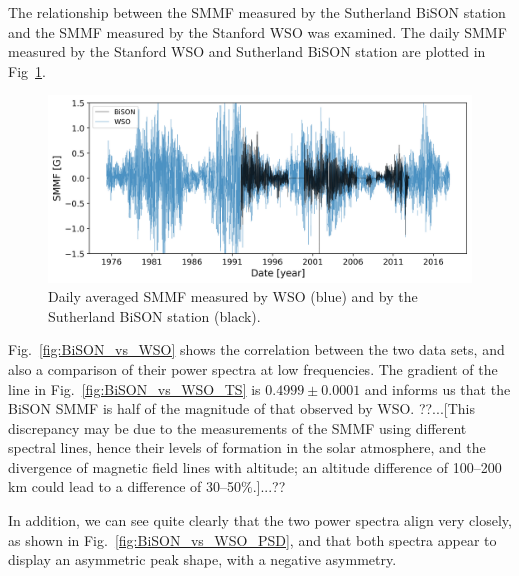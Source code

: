 The relationship between the SMMF measured by the Sutherland BiSON station and the SMMF measured by the Stanford WSO was examined. The daily SMMF measured by the Stanford WSO and Sutherland BiSON station are plotted in Fig~\ref{fig:BiSON_and_WSO}.

\begin{figure}[ht!]
    \centering
	\includegraphics[width=\columnwidth]{BiSON_and_WSO.png}
    \caption{Daily averaged SMMF measured by WSO (blue) and by the Sutherland BiSON station (black).}
    \label{fig:BiSON_and_WSO}
\end{figure}

Fig.~\ref{fig:BiSON_vs_WSO} shows the correlation between the two data sets, and also a comparison of their power spectra at low frequencies. The gradient of the line in Fig.~\ref{fig:BiSON_vs_WSO_TS} is $0.4999\pm0.0001$ and informs us that the BiSON SMMF is half of the magnitude of that observed by WSO. ??...[This discrepancy may be due to the measurements of the SMMF using different spectral lines, hence their levels of formation in the solar atmosphere, and the divergence of magnetic field lines with altitude; an altitude difference of 100--200 km could lead to a difference of 30--50$\%$.]...??

In addition, we can see quite clearly that the two power spectra align very closely, as shown in Fig.~\ref{fig:BiSON_vs_WSO_PSD}, and that both spectra appear to display an asymmetric peak shape, with a negative asymmetry.

